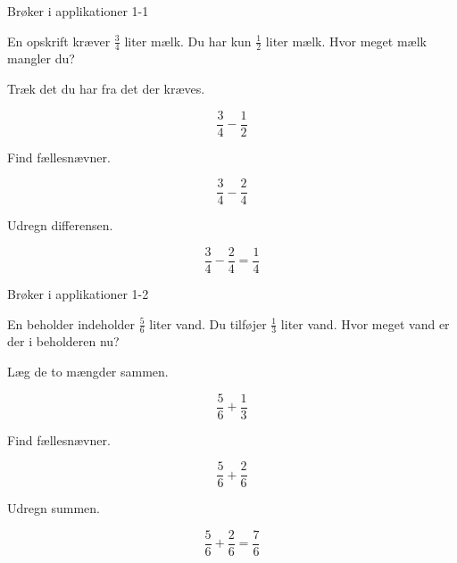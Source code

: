 \documentclass{article}
\begin{document}

\tableofcontents
\newpage

\begin{exercise}{Brøker i applikationer 1-1}

En opskrift kræver $\frac{3}{4}$ liter mælk. Du har kun $\frac{1}{2}$ liter mælk. Hvor meget mælk mangler du?


\hint

Træk det du har fra det der kræves.

\hint
\[
\frac{3}{4} - \frac{1}{2}
\]

\hint

Find fællesnævner.

\hint
\[
\frac{3}{4} - \frac{2}{4}
\]

\hint

Udregn differensen.

\hint
\[
\frac{3}{4} - \frac{2}{4} = \frac{1}{4}
\]

\end{exercise}

\newpage

\begin{exercise}{Brøker i applikationer 1-2}

En beholder indeholder $\frac{5}{6}$ liter vand. Du tilføjer $\frac{1}{3}$ liter vand. Hvor meget vand er der i beholderen nu?


\hint

Læg de to mængder sammen.

\hint
\[
\frac{5}{6} + \frac{1}{3}
\]

\hint

Find fællesnævner.

\hint
\[
\frac{5}{6} + \frac{2}{6}
\]

\hint

Udregn summen.

\hint
\[
\frac{5}{6} + \frac{2}{6} = \frac{7}{6}
\]

\end{exercise}

\newpage
\end{document}
